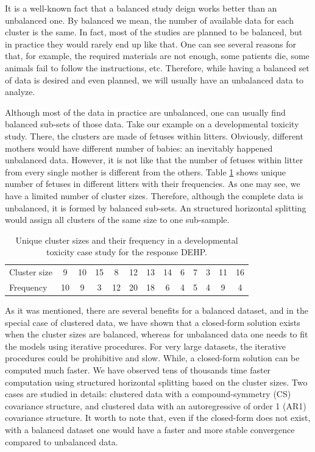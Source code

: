 \documentclass[11pt,a5paper,twoside]{book}
\begin{document}
It is a well-known fact that a balanced study deign works better than an unbalanced one. By balanced we mean, the number of available data for each cluster is the same. In fact, most of the studies are planned to be balanced, but in practice they would rarely end up like that. One can see several reasons for that, for example, the required materials are not enough, some patients die, some animals fail to follow the instructions, etc. Therefore, while having a balanced set of data is desired and even planned, we will usually have an unbalanced data to analyze. 

Although most of the data in practice are unbalanced, one can usually find balanced sub-sets of those data. Take our example on a developmental toxicity study. There, the clusters are made of fetuses within litters. Obviously, different mothers would have different number of babies: an inevitably happened unbalanced data. However, it is not like that the number of fetuses within litter from every single mother is different from the others. Table \ref{tab_litter_size} shows unique number of fetuses in different litters with their frequencies. As one may see, we have a limited number of cluster sizes. Therefore, although the complete data is unbalanced, it is formed by balanced sub-sets. An structured horizontal splitting would assign all clusters of the same size to one sub-sample. 


\begin{table}[ht]
\centering
\label{tab_litter_size}
\caption{Unique cluster sizes and their frequency in a developmental toxicity case study for the response DEHP.}
\begin{tabular}{lcccccccccccc}

  \hline
Cluster size & 9 & 10 & 15 & 8 & 12 & 13 & 14 & 6 & 7 & 3 & 11 & 16 \\ 
  Frequency & 10 & 9 & 3 & 12 & 20 & 18 & 6 & 4 & 5 & 4 & 9 & 4 \\ 
   \hline
\end{tabular}
\end{table}

As it was mentioned, there are several benefits for a balanced dataset, and in the special case of clustered data, we have shown that a closed-form solution exists when the cluster sizes are balanced, whereas for unbalanced data one needs to fit the models using iterative procedures. For very large datasets, the iterative procedures could be prohibitive and slow. While, a closed-form solution can be computed much faster. We have observed tens of thousands time faster computation using structured horizontal splitting based on the cluster sizes. Two cases are studied in details: clustered data with a compound-symmetry (CS) covariance structure, and clustered data with an autoregressive of order 1 (AR1) covariance structure. It worth to note that, even if the closed-form does not exist, with a balanced dataset one would have a faster and more stable convergence compared to unbalanced data.
\end{document}
